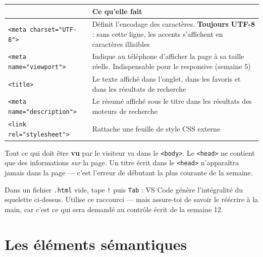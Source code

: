 \documentclass[a4paper,11pt]{article}
\newcommand{\hdr}[1]{\multicolumn{1}{l}{\color{white}\bfseries #1}}
\renewcommand{\arraystretch}{1.3}
\begin{document}
\begin{center}
\renewcommand{\arraystretch}{1.0}
\begin{tabularx}{\linewidth}{p{4.3cm}X}
  \toprule
  \rowcolor{uniNavy}
  \hdr{Balise} & \hdr{Ce qu'elle fait} \\
  \midrule
  \rowcolor{uniPaper}
  \texttt{<meta charset="UTF-8">} & Définit l'encodage des caractères. \textbf{Toujours UTF-8} : sans cette ligne, les accents s'affichent en caractères illisibles \\
  \texttt{<meta name="viewport">} & Indique au téléphone d'afficher la page à sa taille réelle. Indispensable pour le responsive (semaine 5) \\
  \rowcolor{uniPaper}
  \texttt{<title>} & Le texte affiché dans l'onglet, dans les favoris et dans les résultats de recherche \\
  \texttt{<meta name="description">} & Le résumé affiché sous le titre dans les résultats des moteurs de recherche \\
  \rowcolor{uniPaper}
  \texttt{<link rel="stylesheet">} & Rattache une feuille de style CSS externe \\
  \bottomrule
\end{tabularx}
\end{center}

\begin{tcolorbox}[attention, title={\texttt{<head>} et \texttt{<body>} : ne pas confondre}]
Tout ce qui doit être \textbf{vu} par le visiteur va dans le \texttt{<body>}. Le \texttt{<head>} ne contient que des informations \textit{sur} la page. Un titre écrit dans le \texttt{<head>} n'apparaîtra jamais dans la page --- c'est l'erreur de débutant la plus courante de la semaine.
\end{tcolorbox}

\begin{tcolorbox}[astuce, title={Gagner du temps dans VS Code}]
Dans un fichier \texttt{.html} vide, tape \texttt{!} puis \texttt{Tab} : VS Code génère l'intégralité du squelette ci-dessus. Utilise ce raccourci --- mais assure-toi de savoir le réécrire à la main, car c'est ce qui sera demandé au contrôle écrit de la semaine 12.
\end{tcolorbox}

\section{Les éléments sémantiques}
\end{document}

